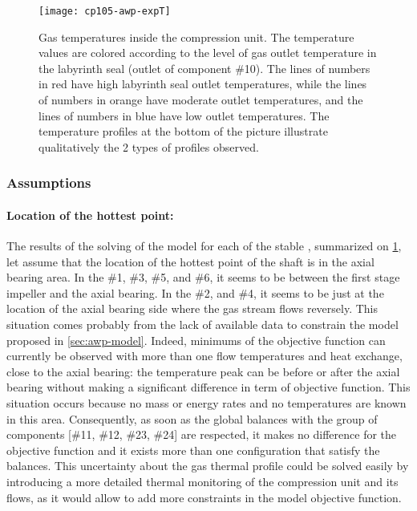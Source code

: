 \begin{figure}[htbp]
  \texttt{[image: cp105-awp-expT]}
  \caption[Gas temperatures inside the compression unit]{Gas
    temperatures inside the compression unit. The temperature values
    are colored according to the level of gas outlet temperature in
    the labyrinth seal (outlet of component \#10). The lines of
    numbers in red have high labyrinth seal outlet temperatures, while
    the lines of numbers in orange have moderate outlet temperatures,
    and the lines of numbers in blue have low outlet temperatures. The
    temperature profiles at the bottom of the picture illustrate
    qualitatively the 2 types of profiles observed.}
  \label{fig:awp-cp-unit-gas-T}
\end{figure}


\subsubsection{Assumptions}
\label{sec:awp-laby-seal-hot-gas-assumptions}


\paragraph{Location of the hottest point:}

The results of the solving of the model for each of the stable \OP{},
summarized on \cref{fig:awp-cp-unit-gas-T}, let assume that the
location of the hottest point of the shaft is in the axial bearing
area. In the \OP{} \#1, \#3, \#5, and \#6, it seems to be between the
first stage impeller and the axial bearing. In the \OP{} \#2, and \#4,
it seems to be just at the location of the axial bearing side where
the gas stream flows reversely. This situation comes probably from the
lack of available data to constrain the model proposed in
\cref{sec:awp-model}. Indeed, minimums of the objective function can
currently be observed with more than one flow temperatures and heat
exchange, close to the axial bearing: the temperature peak can be
before or after the axial bearing without making a significant
difference in term of objective function. This situation occurs
because no mass or energy rates and no temperatures are known in this
area. Consequently, as soon as the global balances with the group of
components [\#11, \#12, \#23, \#24] are respected, it makes no
difference for the objective function and it exists more than one
configuration that satisfy the balances. This uncertainty about the
gas thermal profile could be solved easily by introducing a more
detailed thermal monitoring of the compression unit and its flows, as
it would allow to add more constraints in the model objective
function.

